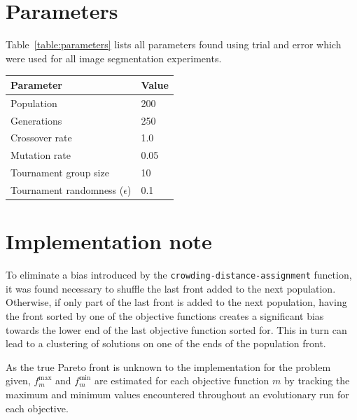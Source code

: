 \documentclass[paper=a4, fontsize=9pt]{scrartcl}
\begin{document}
\begin{multicols}{2}
\section*{Parameters}


Table~\ref{table:parameters} lists all parameters found using trial and error which were used for all image segmentation experiments.\\[0.2cm]

{
\begin{minipage}{\linewidth{}}
\centering
\begin{tabular}{ll}
\toprule
Parameter                          & Value  \\
\midrule
Population                         & 200    \\
Generations                        & 250    \\
Crossover rate                     &   1.0  \\
Mutation rate                      &   0.05 \\
Tournament group size              &  10    \\
Tournament randomness ($\epsilon$) &   0.1  \\
\bottomrule
\end{tabular}
\label{table:parameters}
\end{minipage}
}

\section*{Implementation note}

To eliminate a bias introduced by the \texttt{crowding-distance-assignment} function, it was found necessary to shuffle the last front added to the next population. Otherwise, if only part of the last front is added to the next population, having the front sorted by one of the objective functions creates a significant bias towards the lower end of the last objective function sorted for. This in turn can lead to a clustering of solutions on one of the ends of the population front.

As the true Pareto front is unknown to the implementation for the problem given, $f^\text{max}_m$ and $f^\text{min}_m$ are estimated for each objective function $m$ by tracking the maximum and minimum values encountered throughout an evolutionary run for each objective.




\end{multicols}
\end{document}
